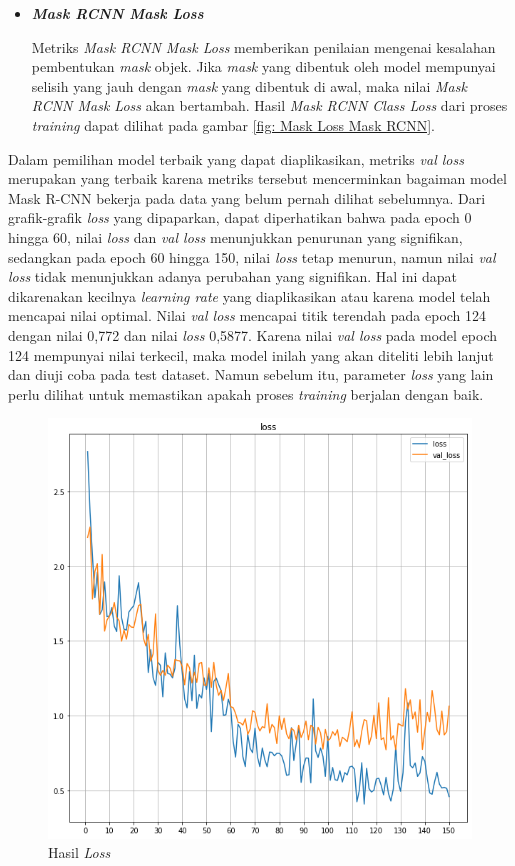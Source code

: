\begin{itemize}
  \item \textbf{\textit{Mask RCNN Mask Loss}}
  
  Metriks \textit{Mask RCNN Mask Loss} memberikan penilaian mengenai kesalahan pembentukan 
  \textit{mask} objek. Jika \textit{mask} yang dibentuk oleh model mempunyai selisih yang jauh dengan
  \textit{mask} yang dibentuk di awal, maka nilai \textit{Mask RCNN Mask Loss} akan bertambah.
  Hasil \textit{Mask RCNN Class Loss} dari proses \textit{training} dapat dilihat pada gambar 
  \ref{fig: Mask Loss Mask RCNN}.

\end{itemize}

Dalam pemilihan model terbaik yang dapat diaplikasikan, metriks \textit{val loss} merupakan yang
terbaik karena metriks tersebut mencerminkan bagaiman model Mask R-CNN bekerja pada data yang belum pernah
dilihat sebelumnya. Dari grafik-grafik \textit{loss} yang dipaparkan, dapat diperhatikan bahwa 
pada epoch 0 hingga 60, nilai \textit{loss} dan \textit{val loss} menunjukkan penurunan yang signifikan,
sedangkan pada epoch 60 hingga 150, nilai \textit{loss} tetap menurun, namun nilai \textit{val loss}
tidak menunjukkan adanya perubahan yang signifikan. Hal ini dapat dikarenakan kecilnya \textit{learning rate}
yang diaplikasikan atau karena model telah mencapai nilai optimal.
Nilai \textit{val loss} mencapai titik terendah pada epoch 124 dengan nilai 0,772 dan nilai 
\textit{loss} 0,5877. Karena nilai \textit{val loss} pada 
model epoch 124 mempunyai nilai terkecil, maka model inilah yang akan diteliti lebih lanjut dan diuji
coba pada test dataset. Namun sebelum itu, parameter \textit{loss} yang lain perlu dilihat untuk
memastikan apakah proses \textit{training} berjalan dengan baik. 

\begin{figure}[h!]
  \begin{center}
    \includegraphics[width= 0.55\linewidth]{bab4/1. Loss_Result.png}
    \caption{Hasil \textit{Loss}}
    \label{fig: Loss}
  \end{center}
\end{figure}

